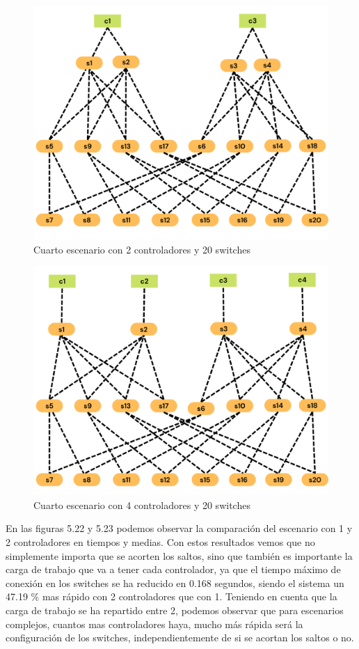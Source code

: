 \documentclass[a4paper, 12pt]{book}
\begin{document}
	\begin{figure}[H]
		\centering
		\includegraphics[width=13cm, keepaspectratio]{img/e4_2}
		\caption{Cuarto escenario con 2 controladores y 20 switches}
		\label{figura:e4_2}
	\end{figure}
	
	
	\begin{figure}[H]
		\centering
		\includegraphics[width=13cm, keepaspectratio]{img/e4_3}
		\caption{Cuarto escenario con 4 controladores y 20 switches}
		\label{figura:e4_3}
	\end{figure}
	
En las figuras 5.22 y 5.23 podemos observar la comparación del escenario con 1 y 2 controladores en tiempos y medias. Con estos resultados vemos que no simplemente importa que se acorten los saltos, sino que también es importante la carga de trabajo que va a tener cada controlador, ya que el tiempo máximo de conexión en los switches se ha reducido en 0.168 segundos, siendo el sistema un 47.19 \% mas rápido con 2 controladores que con 1. Teniendo en cuenta que la carga de trabajo se ha repartido entre 2, podemos observar que para escenarios complejos, cuantos mas controladores haya, mucho más rápida será la configuración de los switches, independientemente de si se acortan los saltos o no.
		
\end{document}
